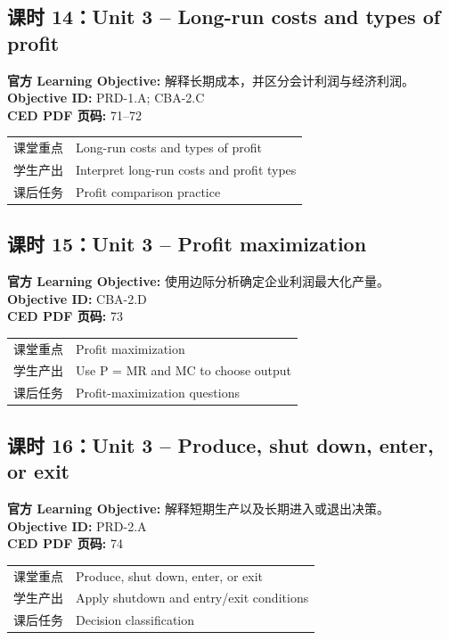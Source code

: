 \documentclass[11pt,a4paper]{ctexart}
\newcommand{\objectivebox}[1]{\noindent\colorbox{aplight}{\parbox{0.96\textwidth}{#1}}}
\begin{document}
\subsection{课时 14：Unit 3 -- Long-run costs and types of profit}
\objectivebox{\textbf{官方 Learning Objective:} 解释长期成本，并区分会计利润与经济利润。\\\textbf{Objective ID:} PRD-1.A; CBA-2.C\\\textbf{CED PDF 页码:} 71–72}\par\vspace{0.4em}
\begin{tabularx}{\textwidth}{p{3.0cm}Y}
\toprule
课堂重点 & Long-run costs and types of profit\\
学生产出 & Interpret long-run costs and profit types\\
课后任务 & Profit comparison practice\\
\bottomrule
\end{tabularx}
\subsection{课时 15：Unit 3 -- Profit maximization}
\objectivebox{\textbf{官方 Learning Objective:} 使用边际分析确定企业利润最大化产量。\\\textbf{Objective ID:} CBA-2.D\\\textbf{CED PDF 页码:} 73}\par\vspace{0.4em}
\begin{tabularx}{\textwidth}{p{3.0cm}Y}
\toprule
课堂重点 & Profit maximization\\
学生产出 & Use P = MR and MC to choose output\\
课后任务 & Profit-maximization questions\\
\bottomrule
\end{tabularx}
\subsection{课时 16：Unit 3 -- Produce, shut down, enter, or exit}
\objectivebox{\textbf{官方 Learning Objective:} 解释短期生产以及长期进入或退出决策。\\\textbf{Objective ID:} PRD-2.A\\\textbf{CED PDF 页码:} 74}\par\vspace{0.4em}
\begin{tabularx}{\textwidth}{p{3.0cm}Y}
\toprule
课堂重点 & Produce, shut down, enter, or exit\\
学生产出 & Apply shutdown and entry/exit conditions\\
课后任务 & Decision classification\\
\bottomrule
\end{tabularx}
\end{document}
